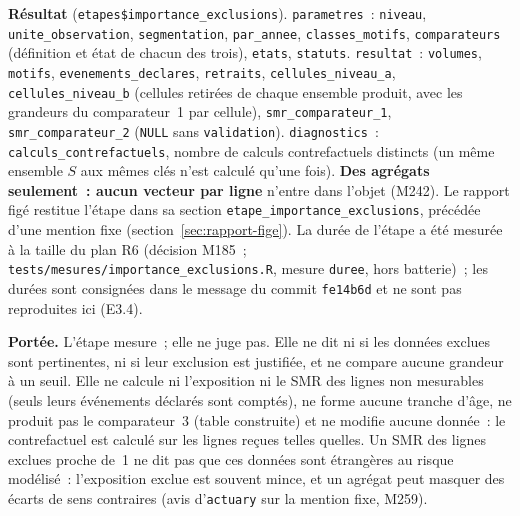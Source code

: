 \documentclass[a4paper,11pt]{article}
\newcommand{\code}[1]{\texttt{\small #1}}
\begin{document}
{\medskip
\textbf{Résultat} (\code{etapes\$importance\_exclusions}).
\code{parametres}~: \code{niveau}, \code{unite\_observation},
\code{segmentation}, \code{par\_annee}, \code{classes\_motifs},
\code{comparateurs} (définition et état de chacun des trois), \code{etats},
\code{statuts}. \code{resultat}~: \code{volumes}, \code{motifs},
\code{evenements\_declares}, \code{retraits}, \code{cellules\_niveau\_a},
\code{cellules\_niveau\_b} (cellules retirées de chaque ensemble produit,
avec les grandeurs du comparateur~1 par cellule), \code{smr\_comparateur\_1},
\code{smr\_comparateur\_2} (\code{NULL} sans \code{validation}).
\code{diagnostics}~: \code{calculs\_contrefactuels}, nombre de calculs
contrefactuels distincts (un même ensemble $S$ aux mêmes clés n'est calculé
qu'une fois). \textbf{Des agrégats seulement~: aucun vecteur par ligne}
n'entre dans l'objet (M242). Le rapport figé restitue l'étape dans sa section
\code{etape\_importance\_}\allowbreak\code{exclusions}, précédée d'une
mention fixe (section~\ref{sec:rapport-fige}). La durée de l'étape a été
mesurée à la taille du plan R6 (décision M185~;
\code{tests/mesures/importance\_exclusions.R}, mesure \code{duree}, hors
batterie)~; les durées sont consignées dans le message du commit
\code{fe14b6d} et ne sont pas reproduites ici (E3.4).

\begin{encadre}
\small
\textbf{Portée.} L'étape mesure~; elle ne juge pas. Elle ne dit ni si les
données exclues sont pertinentes, ni si leur exclusion est justifiée, et ne
compare aucune grandeur à un seuil. Elle ne calcule ni l'exposition ni le
SMR des lignes non mesurables (seuls leurs événements déclarés sont
comptés), ne forme aucune tranche d'âge, ne produit pas le comparateur~3
(table construite) et ne modifie aucune donnée~: le contrefactuel est
calculé sur les lignes reçues telles quelles. Un SMR des lignes exclues
proche de~1 ne dit pas que ces données sont étrangères au risque
modélisé~: l'exposition exclue est souvent mince, et un agrégat peut
masquer des écarts de sens contraires (avis d'\code{actuary} sur la mention
fixe, M259).
\end{encadre}

}
\end{document}
